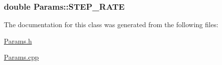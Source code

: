 \hypertarget{class_params_a5631d479c6912c8992ccfe38ea6b4d2a}{
\subsubsection[{\-S\-T\-E\-P\-\_\-\-R\-A\-T\-E}]{\setlength{\rightskip}{0pt plus 5cm}double {\bf \-Params\-::\-S\-T\-E\-P\-\_\-\-R\-A\-T\-E}}}\label{dc/d1d/class_params_a5631d479c6912c8992ccfe38ea6b4d2a}


\-The documentation for this class was generated from the following files\-:\begin{DoxyCompactItemize}
\item 
\hyperlink{_params_8h}{\-Params.\-h}\item 
\hyperlink{_params_8cpp}{\-Params.\-cpp}\end{DoxyCompactItemize}
